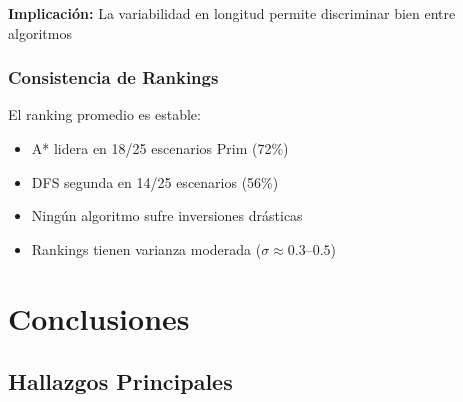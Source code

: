 \documentclass[12pt,a4paper]{article}
\begin{document}
\textbf{Implicación:} La variabilidad en longitud permite discriminar bien entre algoritmos

\subsubsection{Consistencia de Rankings}

El ranking promedio es estable:
\begin{itemize}
    \item A* lidera en 18/25 escenarios Prim (72\%)
    \item DFS segunda en 14/25 escenarios (56\%)
    \item Ningún algoritmo sufre inversiones drásticas
    \item Rankings tienen varianza moderada ($\sigma \approx 0.3$--$0.5$)
\end{itemize}

\section{Conclusiones}

\subsection{Hallazgos Principales}
\end{document}

